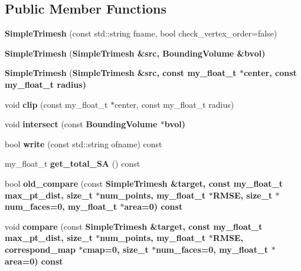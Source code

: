\subsection*{Public Member Functions}
\begin{CompactItemize}
\item 
\textbf{Simple\-Trimesh} (const std::string fname, bool check\_\-vertex\_\-order=false)\label{classSimSite3D_1_1SimpleTrimesh_3e3d62990f6adc85a2f7773896c92f34}

\item 
\textbf{Simple\-Trimesh} (\bf{Simple\-Trimesh} \&src, \bf{Bounding\-Volume} \&bvol)\label{classSimSite3D_1_1SimpleTrimesh_8abd29eec3ba76a51d59835e465a35ee}

\item 
\textbf{Simple\-Trimesh} (\bf{Simple\-Trimesh} \&src, const my\_\-float\_\-t $\ast$center, const my\_\-float\_\-t radius)\label{classSimSite3D_1_1SimpleTrimesh_ef4ffdf1fd937f5209f81d9f58e9b1a9}

\item 
void \textbf{clip} (const my\_\-float\_\-t $\ast$center, const my\_\-float\_\-t radius)\label{classSimSite3D_1_1SimpleTrimesh_6589c1db21145564e4d1e6de26e77060}

\item 
void \textbf{intersect} (const \bf{Bounding\-Volume} $\ast$bvol)\label{classSimSite3D_1_1SimpleTrimesh_db13b6eab9e030cf21c594f2d0613051}

\item 
bool \textbf{write} (const std::string ofname) const \label{classSimSite3D_1_1SimpleTrimesh_4d5fc687d60362490263ef26eade8fbb}

\item 
my\_\-float\_\-t \textbf{get\_\-total\_\-SA} () const \label{classSimSite3D_1_1SimpleTrimesh_fd2c1d5f6be4c731c4b64ec249f6f1ef}

\item 
bool \textbf{old\_\-compare} (const \bf{Simple\-Trimesh} \&target, const my\_\-float\_\-t max\_\-pt\_\-dist, size\_\-t $\ast$num\_\-points, my\_\-float\_\-t $\ast$RMSE, size\_\-t $\ast$num\_\-faces=0, my\_\-float\_\-t $\ast$area=0) const \label{classSimSite3D_1_1SimpleTrimesh_c55aa8f87f4244a93cc319220815b2c1}

\item 
void \textbf{compare} (const \bf{Simple\-Trimesh} \&target, const my\_\-float\_\-t max\_\-pt\_\-dist, size\_\-t $\ast$num\_\-points, my\_\-float\_\-t $\ast$RMSE, correspond\_\-map $\ast$cmap=0, size\_\-t $\ast$num\_\-faces=0, my\_\-float\_\-t $\ast$area=0) const \label{classSimSite3D_1_1SimpleTrimesh_0674ac20bbafd3d2ce88edbf010cb83b}


\end{CompactItemize}
